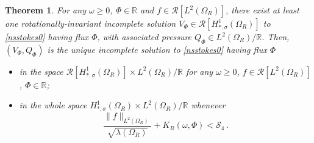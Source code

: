 \documentclass[a4paper,11pt]{article}
\newtheorem{theorem}{Theorem}[section]
\numberwithin{equation}{section}
\numberwithin{figure}{section}
\begin{document}
\begin{theorem} \label{fluxtheo1}
For any $\omega \geq 0$, $\Phi \in \mathbb{R}$ and $f \in \mathcal{R}[L^{2}(\Omega_{R})]$, there exist at least one rotationally-invariant
incomplete solution $V_{\Phi} \in \mathcal{R}[H^{1}_{*,\sigma}(\Omega_{R})]$ to \eqref{nsstokes0} having flux $\Phi$,
with associated pressure $Q_{\Phi} \in L^{2}(\Omega_{R})/\mathbb{R}$. Then, $(V_{\Phi},Q_{\Phi})$ is the unique incomplete solution to \eqref{nsstokes0} having flux $\Phi$
\begin{itemize}
\item in the space $\mathcal{R}[H^{1}_{*,\sigma}(\Omega_{R})] \times L^{2}(\Omega_{R})/\mathbb{R}$ for any $\omega \geq 0$, $f\in \mathcal{R}[L^{2}(\Omega_{R})]$, $\Phi \in \mathbb{R}$;
\item in the whole space $H^{1}_{*,\sigma}(\Omega_{R}) \times L^{2}(\Omega_{R})/\mathbb{R}$ whenever
\begin{equation} \label{umbral1cor3}
\dfrac{\|f\|_{L^2(\Omega_{R})}}{\sqrt{\lambda(\Omega_{R})}} + K_{R}(\omega, \Phi) < \mathcal{S}_4  \, .
\end{equation}
\end{itemize}
\end{theorem}
\noindent
\end{document}
